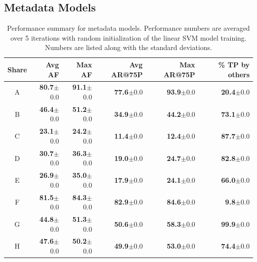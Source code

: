 \subsection{Metadata Models} 
\begin{table}[t!]
{\fontsize{8pt}{1em}\selectfont
\begin{center}
\begin{tabular}{|c|r|r|r|r|r|}
		\hline
		\textbf{Share} & \textbf{Avg AF} & \textbf{Max AF} & \textbf{Avg AR@75P} & \textbf{Max AR@75P} & \textbf{\% TP by others} \tabularnewline
		\hline
A&\textbf{80.7}$\pm$0.0&\textbf{91.1}$\pm$0.0&\textbf{77.6}$\pm$0.0&\textbf{93.9}$\pm$0.0&\textbf{20.4}$\pm$0.0\tabularnewline \hline
B&\textbf{46.4}$\pm$0.0&\textbf{51.2}$\pm$0.0&\textbf{34.9}$\pm$0.0&\textbf{44.2}$\pm$0.0&\textbf{73.1}$\pm$0.0\tabularnewline \hline
C&\textbf{23.1}$\pm$0.0&\textbf{24.2}$\pm$0.0&\textbf{11.4}$\pm$0.0&\textbf{12.4}$\pm$0.0&\textbf{87.7}$\pm$0.0\tabularnewline \hline
D&\textbf{30.7}$\pm$0.0&\textbf{36.3}$\pm$0.0&\textbf{19.0}$\pm$0.0&\textbf{24.7}$\pm$0.0&\textbf{82.8}$\pm$0.0\tabularnewline \hline
E&\textbf{26.9}$\pm$0.0&\textbf{35.0}$\pm$0.0&\textbf{17.9}$\pm$0.0&\textbf{24.1}$\pm$0.0&\textbf{66.0}$\pm$0.0\tabularnewline \hline
F&\textbf{81.5}$\pm$0.0&\textbf{84.3}$\pm$0.0&\textbf{82.9}$\pm$0.0&\textbf{84.6}$\pm$0.0&\textbf{9.8}$\pm$0.0\tabularnewline \hline
G&\textbf{44.8}$\pm$0.0&\textbf{51.3}$\pm$0.0&\textbf{50.6}$\pm$0.0&\textbf{58.3}$\pm$0.0&\textbf{99.9}$\pm$0.0\tabularnewline \hline
H&\textbf{47.6}$\pm$0.0&\textbf{50.2}$\pm$0.0&\textbf{49.9}$\pm$0.0&\textbf{53.0}$\pm$0.0&\textbf{74.4}$\pm$0.0\tabularnewline \hline
\end{tabular}
\end{center}
\caption{Performance summary for metadata models.  Performance
  numbers are averaged over 5 iterations with random
  initialization of the linear SVM model training. Numbers are listed
  along with the standard deviations. }
\label{tab:WithoutBurstsPerf} %
}
\end{table}
